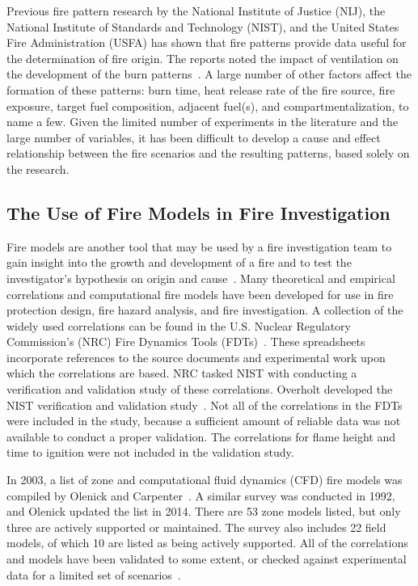\documentclass[twoside]{uocthesis}
\begin{document}
Previous fire pattern research by the National Institute of Justice (NIJ), the National Institute of Standards and Technology (NIST), and the United States Fire Administration (USFA) has shown that fire patterns provide data useful for the determination of fire origin.  The reports noted the impact of ventilation on the development of the burn patterns~\cite{Shanley:1997,Putorti:1997}. A large number of other factors affect the formation of these patterns: burn time, heat release rate of the fire source, fire exposure, target fuel composition, adjacent fuel(s), and compartmentalization, to name a few. Given the limited number of experiments in the literature and the large number of variables, it has been difficult to develop a cause and effect relationship between the fire scenarios and the resulting patterns, based solely on the research.  


\subsection{The Use of Fire Models in Fire Investigation}
Fire models are another tool that may be used by a fire investigation team to gain insight into the growth and development of a fire and to test the investigator’s hypothesis on origin and cause~\cite{Sutula:2001}.  Many theoretical and empirical correlations and computational fire models have been developed for use in fire protection design, fire hazard analysis, and fire investigation.  A collection of the widely used correlations can be found in the U.S. Nuclear Regulatory Commission’s (NRC) Fire Dynamics Tools (FDTs)~\cite{NUREG_1805}. These spreadsheets incorporate references to the source documents and experimental work upon which the correlations are based. NRC tasked NIST with conducting a verification and validation study of these correlations. Overholt developed the NIST verification and validation study~\cite{Overholt:2014}. Not all of the correlations in the FDTs were included in the study, because a sufficient amount of reliable data was not available to conduct a proper validation.  The correlations for flame height and time to ignition were not included in the validation study.

In 2003, a list of zone and computational fluid dynamics (CFD) fire models was compiled by Olenick and Carpenter~\cite{Olenick:2003}. A similar survey was conducted in 1992, and Olenick updated the list in 2014. There are 53 zone models listed, but only three are actively supported or maintained.  The survey also includes 22 field models, of which 10 are listed as being actively supported.  All of the correlations and models have been validated to some extent, or checked against experimental data for a limited set of scenarios~\cite{ASTM_E1355}.
\end{document}
